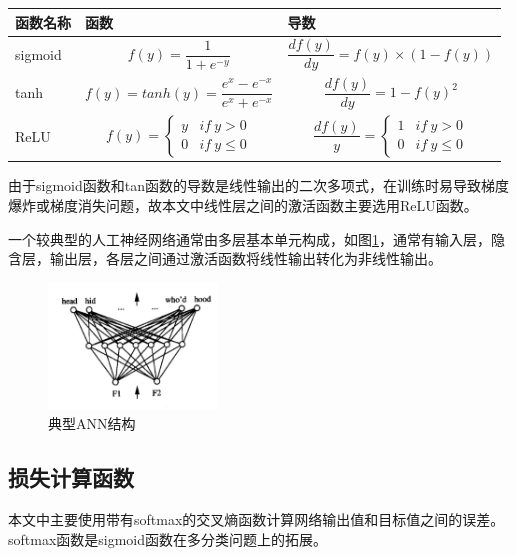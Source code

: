 \begin{center}
\begin{tabu}  to 0.8\textwidth{X|X[3]|X[3]}
\hline
函数名称 & 函数 & 导数 \\
\hline
sigmoid &
$$
f(y) = \frac{1}{1 + e^{-y}}
$$
&
$$
\frac{df(y)}{dy} = f(y) \times (1 - f(y))
$$
\\ \hline
tanh &
$$
f(y) = tanh(y) = \frac{e^x - e^{-x}}{e^x + e^{-x}}
$$
&
$$
\frac{df(y)}{dy} = 1 - {f(y)}^2
$$
\\ \hline
ReLU &
$$
f(y) = \left\{\begin{matrix}
y & if\ y > 0\\ 
0 & if\ y \leq 0
\end{matrix}\right.
$$
&
$$
\frac{df(y)}{y} = \left\{\begin{matrix}
1 & if\ y > 0\\ 
0 & if\ y \leq 0
\end{matrix}\right.
$$
\\ \hline
\end{tabu}
\end{center}
由于sigmoid函数和tan函数的导数是线性输出的二次多项式，在训练时易导致梯度爆炸或梯度消失问题，故本文中线性层之间的激活函数主要选用ReLU函数。\par
一个较典型的人工神经网络通常由多层基本单元构成，如图\ref{ann2}，通常有输入层，隐含层，输出层，各层之间通过激活函数将线性输出转化为非线性输出。\par


\begin{figure}[!hbp]
\begin{center}
\includegraphics[width=0.4\textwidth]{graphic/ann2.png}
\caption{典型ANN结构\cite{ml2006} \label{ann2}}
\end{center}
\end{figure}

\subsection{损失计算函数}
本文中主要使用带有softmax的交叉熵函数计算网络输出值和目标值之间的误差。softmax函数是sigmoid函数在多分类问题上的拓展。


